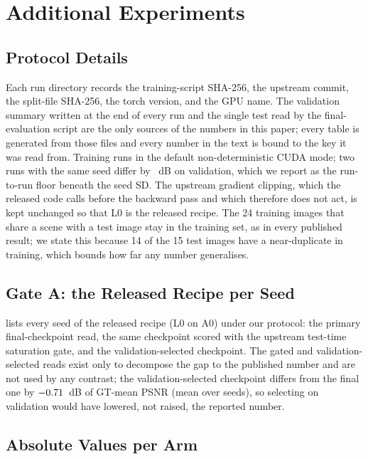 \section{Additional Experiments}
\label{sec:app-experiments}

\subsection{Protocol Details}
\label{sec:app-protocol}

Each run directory records the training-script SHA-256, the upstream \mname commit, the
split-file SHA-256, the torch version, and the GPU name. The validation summary written at
the end of every run and the single test read by the final-evaluation script are the only
sources of the numbers in this paper; every table is generated from those files and every
number in the text is bound to the key it was read from. Training runs in the default
non-deterministic CUDA mode; two runs with the same seed differ by ~dB on
validation, which we report as the run-to-run floor beneath the seed SD. The upstream
gradient clipping, which the released code calls before the backward pass and which
therefore does not act, is kept unchanged so that L0 is the released recipe. The 24 training
images that share a scene with a test image stay in the training set, as in every published
\dataset result; we state this because 14 of the 15 test images have a near-duplicate in
training, which bounds how far any \dataset number generalises.

\subsection{Gate A: the Released Recipe per Seed}
\label{sec:app-gatea}

 lists every seed of the released recipe (L0 on A0) under our
protocol: the primary final-checkpoint read, the same checkpoint scored with the
upstream test-time saturation gate, and the validation-selected checkpoint. The gated and
validation-selected reads exist only to decompose the gap to the published number and are
not used by any contrast; the validation-selected checkpoint differs from the final one by
$-0.71$~dB of GT-mean PSNR (mean over seeds), so selecting on validation would have
lowered, not raised, the reported number.



\subsection{Absolute Values per Arm}
\label{sec:app-arms}

